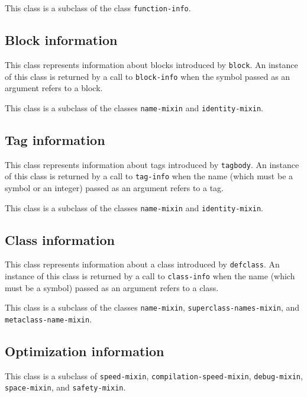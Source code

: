 This class is a subclass of the class \texttt{function-info}.

\subsection{Block information}


This class represents information about blocks introduced by
\texttt{block}.  An instance of this class is returned by a call to
\texttt{block-info} when the symbol passed as an argument refers to a
block.

This class is a subclass of the classes \texttt{name-mixin} and
\texttt{identity-mixin}.

\subsection{Tag information}


This class represents information about tags introduced by
\texttt{tagbody}.  An instance of this class is returned by a call to
\texttt{tag-info} when the name (which must be a symbol or an integer)
passed as an argument refers to a tag.

This class is a subclass of the classes \texttt{name-mixin} and
\texttt{identity-mixin}.

\subsection{Class information}


This class represents information about a class introduced by
\texttt{defclass}.  An instance of this class is returned by a call to
\texttt{class-info} when the name (which must be a symbol)
passed as an argument refers to a class.

This class is a subclass of the classes \texttt{name-mixin},
\texttt{superclass-names-mixin},  and
\texttt{metaclass-name-mixin}.

\subsection{Optimization information}


This class is a subclass of \texttt{speed-mixin},
\texttt{compilation-speed-mixin}, \texttt{debug-mixin},
\texttt{space-mixin}, and \texttt{safety-mixin}.
